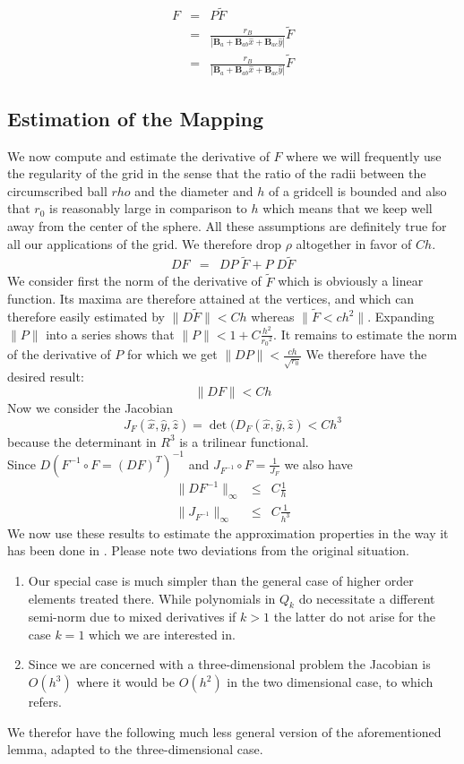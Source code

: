 \documentclass[times]{fldauth}
\newcommand{\mb}{\mathbf}
\begin{document}
\begin{eqnarray*}
F
&=&P \tilde F
\\
&=&\frac{r_B}
       {| \mb B_a +\mb B_{ab} \hat x +\mb B_{ac} \hat y |} 
\tilde F 
\\
&=&\frac{r_B}
       {| \mb B_a +\mb B_{ab} \hat x +\mb B_{ac} \hat y |} 
\tilde F 
\end{eqnarray*}
\subsection{Estimation of the Mapping}
We now compute and estimate the derivative of $F$ where we will frequently use the regularity of the grid in the sense that the ratio of the radii between the circumscribed ball $rho$ and the diameter and $h$ of a gridcell is bounded and also that $r_0$ is reasonably large in comparison to $h$ which means that we keep well away from the center of the sphere. All these assumptions are definitely true for all our applications of the grid. We therefore drop $\rho$ altogether in favor of  $C h$.
\begin{eqnarray*}
DF	&=&	DP\; \tilde F+P \;D \tilde F
\end{eqnarray*}
We consider first the norm of the derivative of $\tilde F$ which is obviously a linear function.
Its maxima are therefore attained at the vertices, and which can therefore easily estimated by $\|D\tilde F\| < Ch$ whereas $\|\tilde F<c h^2\|$.
Expanding $\|P\|$ into a series shows that $\|P\|<1+C \frac{h^2}{{r_0}^2} $.
It remains to estimate the norm of the derivative of $P$ for which we get $\|DP\|<\frac{c h}{\sqrt{r_0}}
$
We therefore have the desired result:
\[
\|DF\|<Ch
\]
Now we consider the Jacobian 
\[
J_F(\hat x, \hat y ,\hat z)=\det(D_F(\hat x, \hat y ,\hat z )< Ch^3
\]
because the determinant in $R^3$ is a trilinear functional. \\
Since $D(F^{-1}\circ F=(D F)^{T})^{-1}$ and $J_{F^{-1}}\circ F=\frac{1}{J_F}$ we also have
\begin{eqnarray*}
\|D F^{-1}\|_{\infty} 		&\le& 		C\frac{1}{h}
\\
\|J_{F^{-1}}\|_{\infty} 	&\le& 		C\frac{1}{h^3}
\end{eqnarray*}
We now use these results to estimate the approximation properties in the way it has been done in \cite[Lemma~A.9 p. 107]{GiraultRaviart}.
Please note two deviations from the original situation.
\begin{enumerate}
   \item 
   Our special case  is much simpler than the general case of higher order elements treated there. While polynomials in $Q_k$ do necessitate a different semi-norm due to mixed derivatives if $k>1$ the latter do not arise for the case $k=1$ which we are interested in.
   \item
   Since we are concerned with a three-dimensional problem the Jacobian is $O(h^3)$ where it would be $O(h^2)$ in the two dimensional case, to which \cite{GiraultRaviart} refers. 
\end{enumerate}
We therefor have the following much less general version of the aforementioned lemma, adapted to the three-dimensional case.
\end{document}
